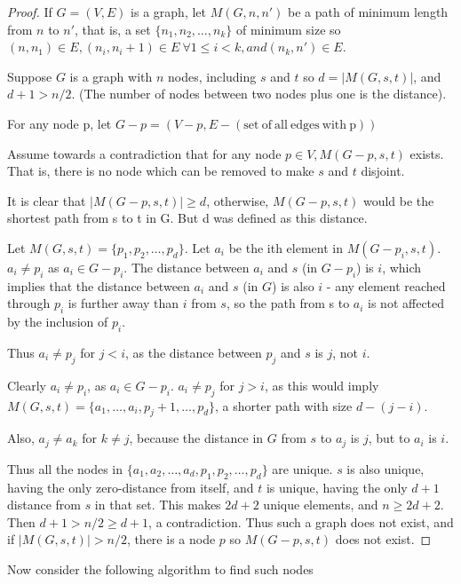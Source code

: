 \documentclass{article}
\begin{document}
\begin{proof}
If $G=(V,E)$ is a graph, let $M(G,n,n')$ be a path of minimum length from $n$ to $n'$, that is, a set $\{n_1, n_2,\dots, n_k\}$ of minimum size so $(n, n_1) \in E, (n_i, n_i+1) \in E\ \forall 1\leq i<k, and (n_k, n') \in E$.

Suppose $G$ is a graph with $n$ nodes, including $s$ and $t$ so $d = |M(G,s,t)|$, and $d+1 > n/2$. (The number of nodes between two nodes plus one is the distance).

For any node p, let $G-p = (V-p, E - (\mathrm{set\ of\ all\ edges\ with\ p}) )$

Assume towards a contradiction that for any node $p \in V, M(G-p,s,t)$ exists. That is, there is no node which can be removed to make $s$ and $t$ disjoint.

It is clear that $|M(G-p,s,t)| \geq d$, otherwise, $M(G-p,s,t)$ would be the shortest path from s to t in G. But d was defined as this distance.

Let $M(G,s,t) = \{p_1, p_2,\dots, p_d\}$.
Let $a_i$ be the ith element in $M(G-p_i,s,t)$. $a_i \neq p_i$ as $a_i \in G-p_i$. The distance between $a_i$ and $s$ (in $G-p_i$) is $i$, which implies that the distance between $a_i$ and $s$ (in $G$) is also $i$ - any element reached through $p_i$ is further away than $i$ from $s$, so the path from s to $a_i$ is not affected by the inclusion of $p_i$.

Thus $a_i \neq p_j$ for $j<i$, as the distance between $p_j$ and $s$ is $j$, not $i$.

Clearly $a_i \neq p_i$, as $a_i \in G-p_i$. $a_i \neq p_j$ for $j>i$, as this would imply $M(G,s,t) = \{a_1, \dots, a_i, p_j+1,\dots, p_d\}$, a shorter path with size $d-(j-i)$.

Also, $a_j \neq a_k$ for $k\neq j$, because the distance in $G$ from $s$ to $a_j$ is $j$, but to $a_i$ is $i$.

Thus all the nodes in $\{a_1, a_2,\dots, a_d, p_1, p_2,\dots, p_d\}$ are unique. $s$ is also unique, having the only zero-distance from itself, and $t$ is unique, having the only $d+1$ distance from $s$ in that set. This makes $2d+2$ unique elements, and $n \geq 2d+2$. Then $d+1 > n/2 \geq d+1$, a contradiction.
Thus such a graph does not exist, and if $|M(G,s,t)| > n/2$, there is a node $p$ so $M(G-p,s,t)$ does not exist.
\end{proof}

Now consider the following algorithm to find such nodes
\end{document}
